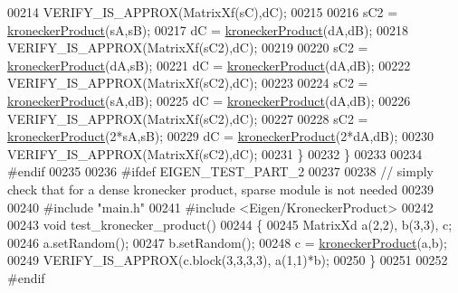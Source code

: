 \begin{DoxyCode}
00214     VERIFY\_IS\_APPROX(MatrixXf(sC),dC);
00215     
00216     sC2 = \hyperlink{namespace_eigen_aedd4b7cd1e324ed0769cac2701f4d050}{kroneckerProduct}(sA,sB);
00217     dC = \hyperlink{namespace_eigen_aedd4b7cd1e324ed0769cac2701f4d050}{kroneckerProduct}(dA,dB);
00218     VERIFY\_IS\_APPROX(MatrixXf(sC2),dC);
00219     
00220     sC2 = \hyperlink{namespace_eigen_aedd4b7cd1e324ed0769cac2701f4d050}{kroneckerProduct}(dA,sB);
00221     dC = \hyperlink{namespace_eigen_aedd4b7cd1e324ed0769cac2701f4d050}{kroneckerProduct}(dA,dB);
00222     VERIFY\_IS\_APPROX(MatrixXf(sC2),dC);
00223     
00224     sC2 = \hyperlink{namespace_eigen_aedd4b7cd1e324ed0769cac2701f4d050}{kroneckerProduct}(sA,dB);
00225     dC = \hyperlink{namespace_eigen_aedd4b7cd1e324ed0769cac2701f4d050}{kroneckerProduct}(dA,dB);
00226     VERIFY\_IS\_APPROX(MatrixXf(sC2),dC);
00227     
00228     sC2 = \hyperlink{namespace_eigen_aedd4b7cd1e324ed0769cac2701f4d050}{kroneckerProduct}(2*sA,sB);
00229     dC = \hyperlink{namespace_eigen_aedd4b7cd1e324ed0769cac2701f4d050}{kroneckerProduct}(2*dA,dB);
00230     VERIFY\_IS\_APPROX(MatrixXf(sC2),dC);
00231   \}
00232 \}
00233 
00234 \textcolor{preprocessor}{#endif}
00235 
00236 \textcolor{preprocessor}{#ifdef EIGEN\_TEST\_PART\_2}
00237 
00238 \textcolor{comment}{// simply check that for a dense kronecker product, sparse module is not needed}
00239 
00240 \textcolor{preprocessor}{#include "main.h"}
00241 \textcolor{preprocessor}{#include <Eigen/KroneckerProduct>}
00242 
00243 \textcolor{keywordtype}{void} test\_kronecker\_product()
00244 \{
00245   MatrixXd a(2,2), b(3,3), c;
00246   a.setRandom();
00247   b.setRandom();
00248   c = \hyperlink{namespace_eigen_aedd4b7cd1e324ed0769cac2701f4d050}{kroneckerProduct}(a,b);
00249   VERIFY\_IS\_APPROX(c.block(3,3,3,3), a(1,1)*b);
00250 \}
00251 
00252 \textcolor{preprocessor}{#endif}
\end{DoxyCode}
